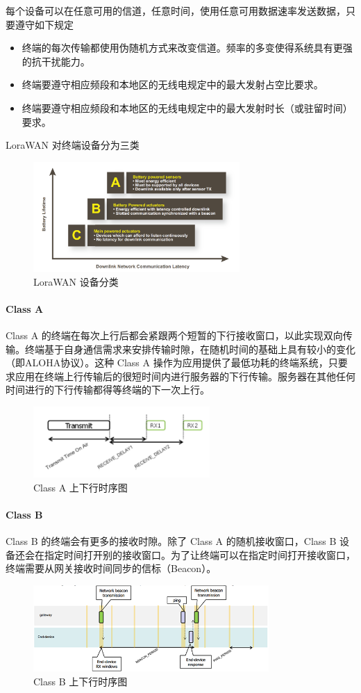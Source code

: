 \documentclass[scheme=chinese,a4paper]{article}
\begin{document}
每个设备可以在任意可用的信道，任意时间，使用任意可用数据速率发送数据，只要遵守如下规定
\begin{itemize}
  \item 终端的每次传输都使用伪随机方式来改变信道。频率的多变使得系统具有更强的抗干扰能力。
  \item 终端要遵守相应频段和本地区的无线电规定中的最大发射占空比要求。
  \item 终端要遵守相应频段和本地区的无线电规定中的最大发射时长（或驻留时间）要求。
\end{itemize}
LoraWAN 对终端设备分为三类
\begin{figure}[H]
\centering
\includegraphics[width=0.7\textwidth]{lorawan_device.png}
\caption{LoraWAN 设备分类}
\end{figure}
\paragraph{Class A}
Class A 的终端在每次上行后都会紧跟两个短暂的下行接收窗口，以此实现双向传输。终端基于自身通信需求来安排传输时隙，在随机时间的基础上具有较小的变化（即ALOHA协议）。这种 Class A 操作为应用提供了最低功耗的终端系统，只要求应用在终端上行传输后的很短时间内进行服务器的下行传输。服务器在其他任何时间进行的下行传输都得等终端的下一次上行。
\begin{figure}[H]
\centering
\includegraphics[width=0.6\textwidth]{class_a.png}
\caption{Class A 上下行时序图}
\end{figure}
\paragraph{Class B}
Class B 的终端会有更多的接收时隙。除了 Class A 的随机接收窗口，Class B 设备还会在指定时间打开别的接收窗口。为了让终端可以在指定时间打开接收窗口，终端需要从网关接收时间同步的信标（Beacon）。
\begin{figure}[H]
\centering
\includegraphics[width=0.8\textwidth]{class_b.png}
\caption{Class B 上下行时序图}
\end{figure}
\end{document}

